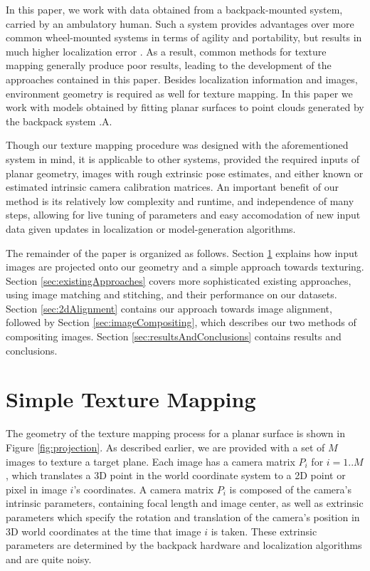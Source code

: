 \documentclass[]{spie}  %
\begin{document}
In this paper, we work with data obtained from a backpack-mounted
system, carried by an ambulatory human. Such a system provides
advantages over more common wheel-mounted systems in terms of agility
and portability, but results in much higher localization error
\cite{liu2010indoor}. As a result, common methods for texture mapping
generally produce poor results, leading to the development of the
approaches contained in this paper. Besides localization information
and images, environment geometry is required as well for texture
mapping. In this paper we work with models obtained by fitting planar
surfaces to point clouds generated by the backpack system
\cite{sanchez2012point}.A.

Though our texture mapping procedure was designed with the
aforementioned system in mind, it is applicable to other systems,
provided the required inputs of planar geometry, images with rough
extrinsic pose estimates, and either known or estimated intrinsic
camera calibration matrices. An important benefit of our method is its
relatively low complexity and runtime, and independence of many steps,
allowing for live tuning of parameters and easy accomodation of new
input data given updates in localization or model-generation
algorithms.

The remainder of the paper is organized as follows. Section
\ref{sec:simpleTextureMapping} explains how input images are projected
onto our geometry and a simple approach towards texturing. Section
\ref{sec:existingApproaches} covers more sophisticated existing
approaches, using image matching and stitching, and their performance
on our datasets. Section \ref{sec:2dAlignment} contains our approach
towards image alignment, followed by Section
\ref{sec:imageCompositing}, which describes our two methods of compositing images. Section \ref{sec:resultsAndConclusions} contains results and conclusions.

\section{Simple Texture Mapping}
\label{sec:simpleTextureMapping}

The geometry of the texture mapping process for a planar surface is
shown in Figure \ref{fig:projection}.  As described earlier, we are
provided with a set of $M$ images to texture a target plane. Each
image has a camera matrix $P_i$ for $i=1..M$, which translates a 3D
point in the world coordinate system to a 2D point or pixel in image
$i$'s coordinates. A camera matrix $P_i$ is composed of the camera's
intrinsic parameters, containing focal length and image center, as
well as extrinsic parameters which specify the rotation and
translation of the camera's position in 3D world coordinates at the
time that image $i$ is taken. These extrinsic parameters are
determined by the backpack hardware and localization algorithms
\cite{chen2010indoor, liu2010indoor, kua2012loopclosure} and are quite
noisy.
\end{document}

